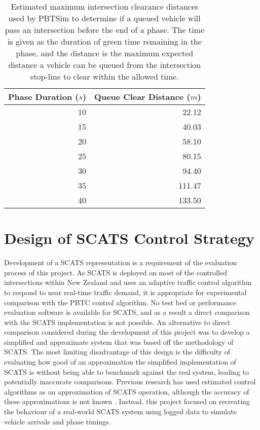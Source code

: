 \begin{table}[]
\begin{center}
\begin{tabular}{rr}
\toprule
Phase Duration ($s$) & Queue Clear Distance ($m$) \\
\midrule
10 & 22.12 \\
15 & 40.03 \\
20 & 58.10 \\
25 & 80.15 \\
30 & 94.40 \\
35 & 111.47 \\
40 & 133.50 \\
\bottomrule
\end{tabular}
\end{center}
\caption{ Estimated maximum intersection clearance distances used by PBTSim to determine if a queued vehicle will pass an intersection before the end of a phase. The time is given as the duration of green time remaining in the phase, and the distance is the maximum expected distance a vehicle can be queued from the intersection stop-line to clear within the allowed time. }
\label{vehiclecleardistances}
\end{table}

\section{Design of SCATS Control Strategy}
\label{sec:scats_strategy}

Development of a SCATS representation is a requirement of the evaluation process of this project. As SCATS is deployed on most of the controlled intersections within New Zealand and uses an adaptive traffic control algorithm to respond to near real-time traffic demand, it is appropriate for experimental comparison with the PBTC control algorithm. No test bed or performance evaluation software is available for SCATS, and as a result a direct comparison with the SCATS implementation is not possible. An alternative to direct comparison considered during the development of this project was to develop a simplified and approximate system that was based off the methodology of SCATS. The most limiting disadvantage of this design is the difficulty of evaluating how good of an approximation the simplified implementation of SCATS is without being able to benchmark against the real system, leading to potentially inaccurate comparisons. Previous research has used estimated control algorithms as an approximation of SCATS operation, although the accuracy of these approximations is not known \cite{akcelik1998evaluation}. Instead, this project focused on recreating the behaviour of a real-world SCATS system using logged data to simulate vehicle arrivals and phase timings.

